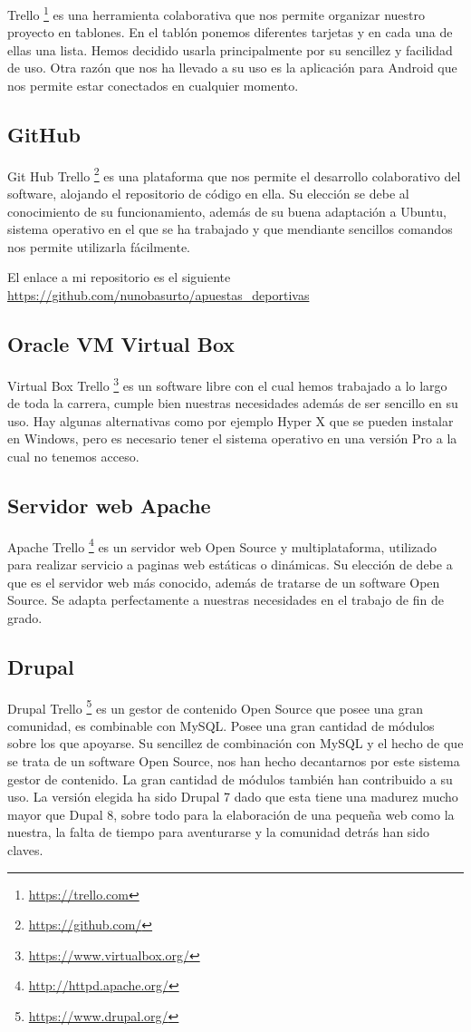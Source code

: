 Trello \footnote{\url{https://trello.com}} es una herramienta colaborativa que nos permite organizar nuestro  proyecto en tablones. En el tablón ponemos diferentes tarjetas y en cada una de ellas una lista.
Hemos decidido usarla principalmente por su sencillez y facilidad de uso. Otra razón que nos ha llevado a su uso es la aplicación para Android que nos permite estar  conectados en cualquier momento.

\subsection{GitHub}
Git Hub 
Trello \footnote{\url{https://github.com/}} es una plataforma que nos permite el desarrollo colaborativo del software, alojando el repositorio de código en ella.
Su elección se debe al conocimiento de su funcionamiento, además de su buena adaptación a Ubuntu, sistema operativo en el que se ha trabajado y que mendiante sencillos comandos nos permite utilizarla fácilmente. 

El enlace a mi repositorio es el siguiente \url{https://github.com/nunobasurto/apuestas_deportivas}

\subsection{Oracle VM Virtual Box}
Virtual Box 
Trello \footnote{\url{https://www.virtualbox.org/}} es un software libre con el cual hemos trabajado a lo largo de toda la carrera, cumple bien nuestras necesidades además de ser sencillo en su uso. Hay algunas alternativas como por ejemplo Hyper X que se pueden instalar en Windows, pero es necesario tener el sistema operativo en una versión Pro a la cual no tenemos acceso.

\subsection{Servidor web Apache}
Apache 
Trello \footnote{\url{http://httpd.apache.org/}} es un servidor web Open Source y multiplataforma, utilizado para realizar servicio a paginas web estáticas o dinámicas.
Su elección de debe a que es el servidor web más conocido, además de tratarse de un software Open Source. Se adapta perfectamente a nuestras necesidades en el trabajo de fin de grado.


\subsection{Drupal}
Drupal 
Trello \footnote{\url{https://www.drupal.org/}} es un gestor de contenido Open Source que posee una gran comunidad, es combinable con MySQL. Posee una gran cantidad de módulos sobre los que apoyarse.
Su sencillez de combinación con MySQL y el hecho de que se trata de un software Open Source, nos han hecho decantarnos por este sistema gestor de contenido. La gran cantidad de módulos también han contribuido a su uso.
La versión elegida ha sido Drupal 7 dado que esta tiene una madurez mucho mayor que Dupal 8, sobre todo para la elaboración de una pequeña web como la nuestra, la falta de tiempo para aventurarse y la comunidad detrás han sido claves.

